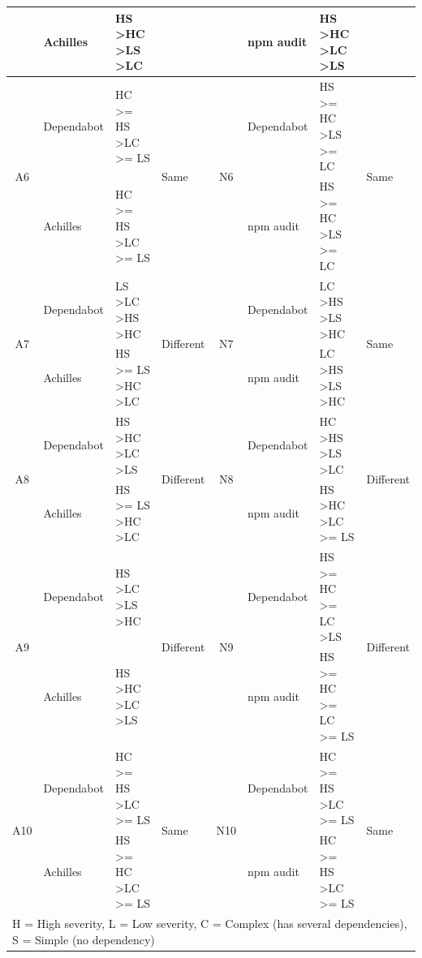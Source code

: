 \documentclass[conference]{IEEEtran}
\begin{document}
\begin{table}
\begin{tabular}{clll|clll}
			& Achilles      & HS \textgreater HC \textgreater LS \textgreater LC       & & & npm audit & HS \textgreater HC \textgreater LC \textgreater LS & \\ \midrule
			\multirow{2}{*}{A6}   & Dependabot    & HC \textgreater{}= HS \textgreater LC \textgreater{}= LS & \multirow{2}{*}{Same} & \multirow{2}{*}{N6} & Dependabot & HS \textgreater{}= HC \textgreater LS \textgreater{}= LC & \multirow{2}{*}{Same} \\ 
			& Achilles      & HC \textgreater{}= HS \textgreater LC \textgreater{}= LS & & & npm audit & HS \textgreater{}= HC \textgreater LS \textgreater{}= LC & \\ \midrule
			\multirow{2}{*}{A7}   & Dependabot    & LS \textgreater LC \textgreater HS \textgreater HC       & \multirow{2}{*}{Different} & \multirow{2}{*}{N7} & Dependabot & LC \textgreater HS \textgreater LS \textgreater HC& \multirow{2}{*}{Same} \\ 
			& Achilles      & HS \textgreater{}= LS \textgreater HC \textgreater LC    & & & npm audit & LC \textgreater HS \textgreater LS \textgreater HC& \\ \midrule
			\multirow{2}{*}{A8}   & Dependabot    & HS \textgreater HC \textgreater LC \textgreater LS       & \multirow{2}{*}{Different} & \multirow{2}{*}{N8}  & Dependabot & HC \textgreater HS \textgreater LS \textgreater LC & \multirow{2}{*}{Different} \\ 
			& Achilles      & HS \textgreater{}= LS \textgreater HC \textgreater LC    & & & npm audit & HS \textgreater HC \textgreater LC \textgreater{}= LS & \\ \midrule
			\multirow{2}{*}{A9}   & Dependabot    & HS \textgreater LC \textgreater LS \textgreater HC       & \multirow{2}{*}{Different} & \multirow{2}{*}{N9} & Dependabot & HS \textgreater{}= HC \textgreater{}= LC \textgreater LS  & \multirow{2}{*}{Different} \\ 
			& Achilles      & HS \textgreater HC \textgreater LC \textgreater LS       & & & npm audit & HS \textgreater{}= HC \textgreater{}= LC \textgreater{}= LS & \\ \midrule
			\multirow{2}{*}{A10}  & Dependabot    & HC \textgreater{}= HS \textgreater LC \textgreater{}= LS & \multirow{2}{*}{Same} & \multirow{2}{*}{N10} & Dependabot & HC \textgreater{}= HS \textgreater LC \textgreater{}= LS & \multirow{2}{*}{Same} \\ 
			& Achilles      & HS \textgreater{}= HC \textgreater LC \textgreater{}= LS & & & npm audit & HC \textgreater{}= HS \textgreater LC \textgreater{}= LS & \\ \midrule
			\multicolumn{8}{l}{H = High severity, L = Low severity, C = Complex (has several dependencies), S = Simple (no dependency)} \\
		\end{tabular}
		\label{table:result-Ach-t1}
	\end{table}
	
\end{document}
